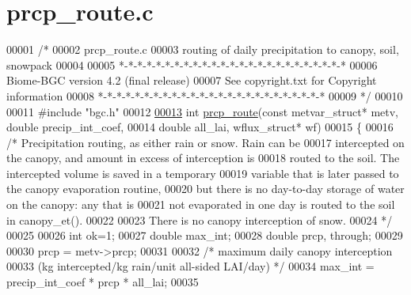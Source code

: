 \hypertarget{prcp__route_8c_source}{}\section{prcp\+\_\+route.\+c}
\label{prcp__route_8c_source}

\begin{DoxyCode}
00001 \textcolor{comment}{/* }
00002 \textcolor{comment}{prcp\_route.c}
00003 \textcolor{comment}{routing of daily precipitation to canopy, soil, snowpack}
00004 \textcolor{comment}{}
00005 \textcolor{comment}{*-*-*-*-*-*-*-*-*-*-*-*-*-*-*-*-*-*-*-*-*-*-*-*-*}
00006 \textcolor{comment}{Biome-BGC version 4.2 (final release)}
00007 \textcolor{comment}{See copyright.txt for Copyright information}
00008 \textcolor{comment}{*-*-*-*-*-*-*-*-*-*-*-*-*-*-*-*-*-*-*-*-*-*-*-*-*}
00009 \textcolor{comment}{*/}
00010 
00011 \textcolor{preprocessor}{#include "bgc.h"}
00012 
\hypertarget{prcp__route_8c_source_l00013}{}\hyperlink{prcp__route_8c_a5215fb55bf012e8cc6bb76df6ef10f08}{00013} \textcolor{keywordtype}{int} \hyperlink{prcp__route_8c_a5215fb55bf012e8cc6bb76df6ef10f08}{prcp\_route}(\textcolor{keyword}{const} metvar\_struct* metv, \textcolor{keywordtype}{double} precip\_int\_coef,
00014 \textcolor{keywordtype}{double} all\_lai, wflux\_struct* wf) 
00015 \{
00016     \textcolor{comment}{/* Precipitation routing, as either rain or snow.  Rain can be}
00017 \textcolor{comment}{    intercepted on the canopy, and amount in excess of interception is}
00018 \textcolor{comment}{    routed to the soil.  The intercepted volume is saved in a temporary}
00019 \textcolor{comment}{    variable that is later passed to the canopy evaporation routine,}
00020 \textcolor{comment}{    but there is no day-to-day storage of water on the canopy: any that is}
00021 \textcolor{comment}{    not evaporated in one day is routed to the soil in canopy\_et().}
00022 \textcolor{comment}{    }
00023 \textcolor{comment}{    There is no canopy interception of snow.}
00024 \textcolor{comment}{    */}
00025     
00026     \textcolor{keywordtype}{int} ok=1;
00027     \textcolor{keywordtype}{double} max\_int;
00028     \textcolor{keywordtype}{double} prcp, through;
00029 
00030     prcp = metv->prcp;
00031 
00032     \textcolor{comment}{/* maximum daily canopy interception }
00033 \textcolor{comment}{    (kg intercepted/kg rain/unit all-sided LAI/day) */}
00034     max\_int = precip\_int\_coef * prcp * all\_lai;
00035 

\end{DoxyCode}
